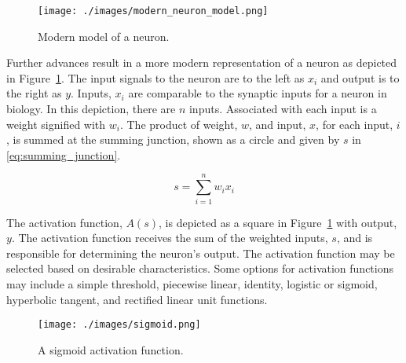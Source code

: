\begin{figure}[h]
    \texttt{[image: ./images/modern\_neuron\_model.png]} 
    \caption{Modern model of a neuron\cite{haykin1998neural}.}
    \label{fig:neuron_model}
\end{figure}

Further advances result in a more modern representation of a neuron as depicted
in Figure~\ref{fig:neuron_model}. The input signals to the neuron are to the left
as $x_i$ and output is to the right as $y$. Inputs, $x_i$ are comparable to the
synaptic inputs for a neuron in biology. In this depiction, there are $n$
inputs. Associated with each input is a weight signified with $w_i$. The product
of weight, $w$, and input, $x$, for each input, $i$, is summed at the summing
junction, shown as a circle and given by $s$ in \eqref{eq:summing_junction}.

\begin{equation}\label{eq:summing_junction}
    s = \sum_{i = 1}^{n} w_i x_i
\end{equation}

The activation function, $A(s)$, is depicted as a square in
Figure~\ref{fig:neuron_model} with output, $y$. The activation function receives
the sum of the weighted inputs, $s$, and is responsible for determining the
neuron's output.  The activation function may be selected based on desirable
characteristics. Some options for activation functions may include a simple
threshold, piecewise linear, identity, logistic or sigmoid, hyperbolic tangent,
and rectified linear unit functions\cite{haykin1998neural}.


\begin{figure}[H]
    \texttt{[image: ./images/sigmoid.png]}
    \caption{A sigmoid activation function.}
    \label{fig:sigmoid}
\end{figure}


